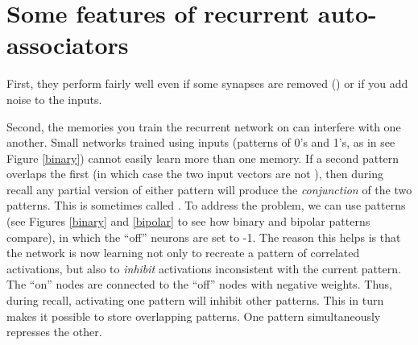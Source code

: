
\section{Some features of recurrent auto-associators}

First, they perform fairly well even if some synapses are removed () or if you add noise to the inputs.

Second, the memories you train the recurrent network on can interfere with one another. Small networks trained using  inputs (patterns of 0's and 1's, as in see Figure \ref{binary}) cannot easily learn more than one memory. If a second pattern overlaps the first (in which case the two input vectors are not ), then during recall any partial version of either pattern will produce the \emph{conjunction} of the two patterns. This is sometimes called . To address the problem, we can use  patterns (see Figures \ref{binary} and \ref{bipolar} to see how binary and bipolar patterns compare), in which the ``off'' neurons are set to -1. The reason this helps is that the network is now learning not only to recreate a pattern of correlated activations, but also to \emph{inhibit} activations inconsistent with the current pattern. The ``on'' nodes are connected to the ``off'' nodes with negative weights. Thus, during recall, activating one pattern will inhibit other patterns. This in turn makes it possible to store overlapping patterns. One pattern simultaneously represses the other. 


